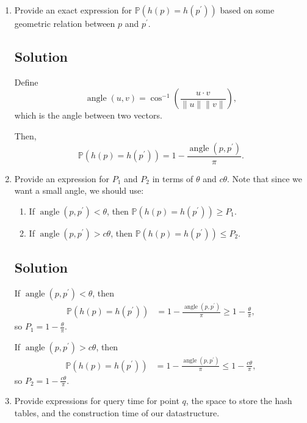 \begin{enumerate}
\item Provide an exact expression for
  $\mathbb{P}\left(h\left(p\right) = h\left(p^\prime\right)\right)$ based on
  some geometric relation between $p$ and $p^\prime$.

  \subsection*{Solution}

  Define
  \begin{equation}
    \operatorname{angle}\left(u, v\right) =
    \cos^{-1}\left(\frac{u \cdot v}{\lVert u \rVert \lVert v \rVert} \right),
  \end{equation}
  which is the angle between two vectors.

  Then,
  \begin{equation}
    \boxed{\mathbb{P}\left(h\left(p\right) = h\left(p^\prime\right)\right)
      = 1 - \frac{\operatorname{angle}\left(p,p^\prime\right)}{\pi}.}
  \end{equation}
\item Provide an expression for $P_1$ and $P_2$ in terms of $\theta$ and
  $c\theta$. Note that since we want a small angle, we should use:
  \begin{enumerate}
  \item If $\operatorname{angle}\left(p,p^\prime\right) < \theta$, then
    $\mathbb{P}\left(h\left(p\right) = h\left(p^\prime\right)\right) \geq P_1$.        
  \item If $\operatorname{angle}\left(p,p^\prime\right) > c\theta$, then
    $\mathbb{P}\left(h\left(p\right) = h\left(p^\prime\right)\right) \leq P_2$.
  \end{enumerate}

  \subsection*{Solution}

  If $\operatorname{angle}\left(p,p^\prime\right) < \theta$, then
  \begin{align*}
    \mathbb{P}\left(h\left(p\right) = h\left(p^\prime\right)\right)
    &= 1 - \frac{\operatorname{angle}\left(p,p^\prime\right)}{\pi} 
    \geq 1 - \frac{\theta}{\pi},
  \end{align*}
  so $\displaystyle\boxed{P_1 = 1 - \frac{\theta}{\pi}.}$

  If $\operatorname{angle}\left(p,p^\prime\right) > c\theta$, then
  \begin{align*}
    \mathbb{P}\left(h\left(p\right) = h\left(p^\prime\right)\right)
    &= 1 - \frac{\operatorname{angle}\left(p,p^\prime\right)}{\pi}
    \leq 1 - \frac{c\theta}{\pi},
  \end{align*}
  so $\displaystyle\boxed{P_2 = 1 - \frac{c\theta}{\pi}.}$
\item Provide expressions for query time for point $q$, the space to store the
  hash tables, and the construction time of our datastructure.


\end{enumerate}
